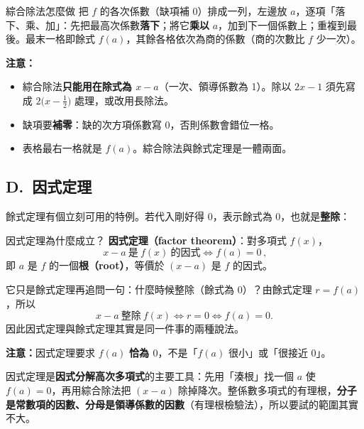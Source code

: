 \documentclass[11pt]{article}
\begin{document}
\begin{補充框}{綜合除法怎麼做}
把 $f$ 的各次係數（缺項補 $0$）排成一列，左邊放 $a$，逐項「落下、乘、加」：先把最高次係數\textbf{落下}；將它\textbf{乘以} $a$，加到下一個係數上；重複到最後。最末一格即餘式 $f(a)$，其餘各格依次為商的係數（商的次數比 $f$ 少一次）。

\textbf{注意：}
\begin{itemize}\setlength{\itemsep}{1pt}
\item 綜合除法\textbf{只能用在除式為 $x-a$}（一次、領導係數為 1）。除以 $2x-1$ 須先寫成 $2\big(x-\tfrac12\big)$ 處理，或改用長除法。
\item 缺項要\textbf{補零}：缺的次方項係數寫 $0$，否則係數會錯位一格。
\item 表格最右一格就是 $f(a)$。綜合除法與餘式定理是一體兩面。
\end{itemize}
\end{補充框}


\subsection*{\sffamily D.\ 因式定理}

餘式定理有個立刻可用的特例。若代入剛好得 $0$，表示餘式為 $0$，也就是\textbf{整除}：

\begin{補充框}{因式定理為什麼成立？}
\textbf{因式定理（factor theorem）}：對多項式 $f(x)$，
$$\boxed{\,x-a\ \text{是}\ f(x)\ \text{的因式}\iff f(a)=0\,},$$
即 $a$ 是 $f$ 的一個\textbf{根（root）}，等價於 $(x-a)$ 是 $f$ 的因式。

它只是餘式定理再追問一句：什麼時候整除（餘式為 0）？由餘式定理 $r=f(a)$，所以
$$x-a\ \text{整除}\ f(x)\iff r=0\iff f(a)=0.$$
因此因式定理與餘式定理其實是同一件事的兩種說法。

\textbf{注意：}因式定理要求 $f(a)$ \textbf{恰為 $0$}，不是「$f(a)$ 很小」或「很接近 $0$」。
\end{補充框}

因式定理是\textbf{因式分解高次多項式}的主要工具：先用「湊根」找一個 $a$ 使 $f(a)=0$，再用綜合除法把 $(x-a)$ 除掉降次。整係數多項式的有理根，\textbf{分子是常數項的因數、分母是領導係數的因數}（有理根檢驗法），所以要試的範圍其實不大。
\end{document}
